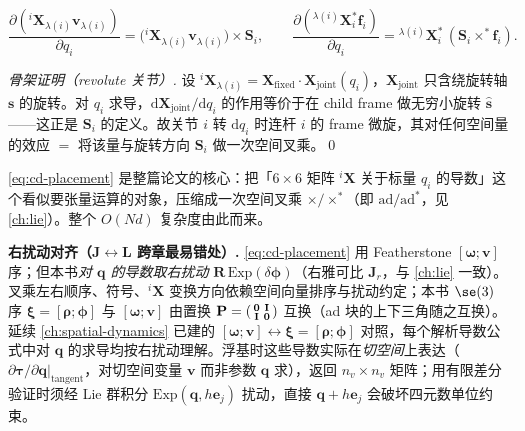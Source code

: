 \begin{theorem}\label{thm:cd-placement}
\begin{equation}
  \frac{\partial({}^i\mathbf X_{\lambda(i)}\mathbf v_{\lambda(i)})}{\partial q_i}=\big({}^i\mathbf X_{\lambda(i)}\mathbf v_{\lambda(i)}\big)\times\mathbf S_i,\qquad
  \frac{\partial({}^{\lambda(i)}\mathbf X_i^*\mathbf f_i)}{\partial q_i}={}^{\lambda(i)}\mathbf X_i^*\,(\mathbf S_i\times^*\mathbf f_i).
  \label{eq:cd-placement}
\end{equation}
\end{theorem}
\begin{proof}[骨架证明（revolute 关节）]
设 ${}^i\mathbf X_{\lambda(i)}=\mathbf X_{\text{fixed}}\cdot\mathbf X_{\text{joint}}(q_i)$，$\mathbf X_{\text{joint}}$ 只含绕旋转轴 $\mathbf s$ 的旋转。对 $q_i$ 求导，$\mathrm d\mathbf X_{\text{joint}}/\mathrm dq_i$ 的作用等价于在 child frame 做无穷小旋转 $\hat{\mathbf s}$——这正是 $\mathbf S_i$ 的定义。故关节 $i$ 转 $\mathrm dq_i$ 时连杆 $i$ 的 frame 微旋，其对任何空间量的效应 $=$ 将该量与旋转方向 $\mathbf S_i$ 做一次空间叉乘。\qed
\end{proof}

\begin{insight}[一招制胜]
\cref{eq:cd-placement} 是整篇论文的核心：把「$6\times6$ 矩阵 ${}^i\mathbf X$ 关于标量 $q_i$ 的导数」这个看似要张量运算的对象，压缩成一次空间叉乘 $\times/\times^*$（即 $\mathrm{ad}/\mathrm{ad}^*$，见 \cref{ch:lie}）。整个 $O(Nd)$ 复杂度由此而来。
\end{insight}

\begin{note}
\textbf{右扰动对齐（J$\leftrightarrow$L 跨章最易错处）.}\;
\cref{eq:cd-placement} 用 Featherstone $[\boldsymbol\omega;\mathbf v]$ 序；但本书\emph{对 $\mathbf q$ 的导数取右扰动} $\mathbf R\,\mathrm{Exp}(\delta\boldsymbol\phi)$（右雅可比 $\mathbf J_r$，与 \cref{ch:lie} 一致）。叉乘左右顺序、符号、${}^i\mathbf X$ 变换方向依赖空间向量排序与扰动约定；本书 $\se(3)$ 序 $\boldsymbol\xi=[\boldsymbol\rho;\boldsymbol\phi]$ 与 $[\boldsymbol\omega;\mathbf v]$ 由置换 $\mathbf P=\begin{psmallmatrix}\mathbf 0&\mathbf I\\\mathbf I&\mathbf 0\end{psmallmatrix}$ 互换（ad 块的上下三角随之互换）。延续 \cref{ch:spatial-dynamics} 已建的 $[\boldsymbol\omega;\mathbf v]\leftrightarrow\boldsymbol\xi=[\boldsymbol\rho;\boldsymbol\phi]$ 对照，每个解析导数公式中对 $\mathbf q$ 的求导均按右扰动理解。浮基时这些导数实际在\emph{切空间}上表达（$\partial\boldsymbol\tau/\partial\mathbf q|_{\text{tangent}}$，对切空间变量 $\mathbf v$ 而非参数 $\mathbf q$ 求），返回 $n_v\times n_v$ 矩阵；用有限差分验证时须经 Lie 群积分 $\mathrm{Exp}(\mathbf q,h\mathbf e_j)$ 扰动，直接 $\mathbf q+h\mathbf e_j$ 会破坏四元数单位约束。
\end{note}

